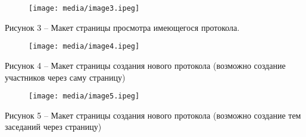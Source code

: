 \documentclass[12pt,a4paper]{article}
\begin{document}
	\begin{figure}[h]
		\centering
		\texttt{[image: media/image3.ipeg]}
	\end{figure}
	
	\begin{center}Рисунок 3 – Макет страницы просмотра имеющегося протокола.\end{center}
	
	\begin{figure}[h]
		\centering
		\texttt{[image: media/image4.ipeg]}
	\end{figure}
	
	\begin{center}Рисунок 4 – Макет страницы создания нового протокола (возможно создание участников через саму страницу)\end{center}
	
	\begin{figure}[h]
		\centering
		\texttt{[image: media/image5.ipeg]}
	\end{figure}
	
	\begin{center}Рисунок 5 – Макет страницы создания нового протокола (возможно создание тем заседаний через страницу)\end{center}
	
\end{document}
